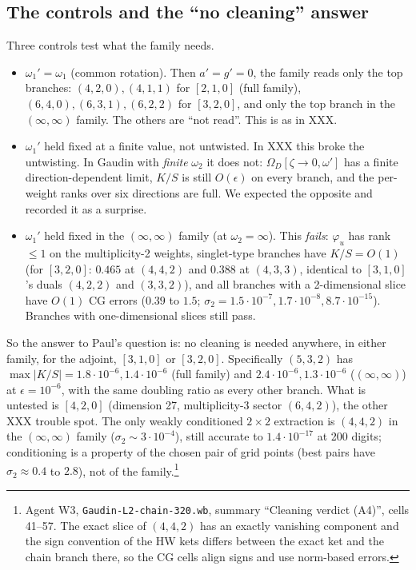 \documentclass[11pt]{article}
\begin{document}
\subsection{The controls and the ``no cleaning'' answer}\label{sec:controls}

Three controls test what the family needs.

\begin{itemize}
\item $\omega_1'=\omega_1$ (common rotation).
Then $a'=g'=0$, the family reads only the top branches: $(4,2,0),(4,1,1)$ for $[2,1,0]$ (full family), $(6,4,0),(6,3,1),(6,2,2)$ for $[3,2,0]$, and only the top branch in the $(\infty,\infty)$ family.
The others are ``not read''. This is as in XXX.
\item $\omega_1'$ held fixed at a finite value, not untwisted.
In XXX this broke the untwisting.
In Gaudin with \emph{finite} $\omega_2$ it does not: $\Omega_D[\zeta\to0,\omega']$ has a finite direction-dependent limit, $K/S$ is still $O(\epsilon)$ on every branch, and the per-weight ranks over six directions are full.
We expected the opposite and recorded it as a surprise.
\item $\omega_1'$ held fixed in the $(\infty,\infty)$ family (at $\omega_2=\infty$).
This \emph{fails}: $\varphi_u$ has rank $\le1$ on the multiplicity-2 weights, singlet-type branches have $K/S=O(1)$ (for $[3,2,0]$: $0.465$ at $(4,4,2)$ and $0.388$ at $(4,3,3)$, identical to $[3,1,0]$'s duals $(4,2,2)$ and $(3,3,2)$), and all branches with a 2-dimensional slice have $O(1)$ CG errors ($0.39$ to $1.5$; $\sigma_2=1.5\cdot10^{-7},1.7\cdot10^{-8},8.7\cdot10^{-15}$).
Branches with one-dimensional slices still pass.
\end{itemize}

So the answer to Paul's question is: no cleaning is needed anywhere, in either family, for the adjoint, $[3,1,0]$ or $[3,2,0]$. Specifically $(5,3,2)$ has $\max|K/S|=1.8\cdot10^{-6},1.4\cdot10^{-6}$ (full family) and $2.4\cdot10^{-6},1.3\cdot10^{-6}$ ($(\infty,\infty)$) at $\epsilon=10^{-6}$, with the same doubling ratio as every other branch.
What is untested is $[4,2,0]$ (dimension 27, multiplicity-3 sector $(6,4,2)$), the other XXX trouble spot.
The only weakly conditioned $2\times2$ extraction is $(4,4,2)$ in the $(\infty,\infty)$ family ($\sigma_2\sim3\cdot10^{-4}$), still accurate to $1.4\cdot10^{-17}$ at 200 digits; conditioning is a property of the chosen pair of grid points (best pairs have $\sigma_2\approx0.4$ to $2.8$), not of the family.\footnote{Agent W3, \texttt{Gaudin-\allowbreak{}L2-\allowbreak{}chain-\allowbreak{}320.\allowbreak{}wb}, summary ``Cleaning verdict (A4)'', cells 41--57.
The exact slice of $(4,4,2)$ has an exactly vanishing component and the sign convention of the HW kets differs between the exact ket and the chain branch there, so the CG cells align signs and use norm-based errors.}
\end{document}
